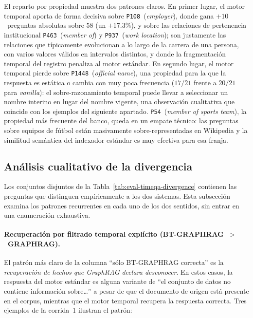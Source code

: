 El reparto por propiedad muestra dos patrones claros. En primer lugar, el motor temporal aporta de forma decisiva sobre \texttt{P108}~(\emph{employer}), donde gana $+10$~preguntas absolutas sobre $58$ (un $+17.3\%$), y sobre las relaciones de pertenencia institucional \texttt{P463}~(\emph{member of}) y \texttt{P937}~(\emph{work location}); son justamente las relaciones que típicamente evolucionan a lo largo de la carrera de una persona, con varios valores válidos en intervalos distintos, y donde la fragmentación temporal del registro penaliza al motor estándar. En segundo lugar, el motor temporal pierde sobre \texttt{P1448}~(\emph{official name}), una propiedad para la que la respuesta es estática o cambia con muy poca frecuencia ($17/21$ frente a $20/21$ para \emph{vanilla}): el sobre-razonamiento temporal puede llevar a seleccionar un nombre interino en lugar del nombre vigente, una observación cualitativa que coincide con los ejemplos del siguiente apartado. \texttt{P54}~(\emph{member of sports team}), la propiedad más frecuente del banco, queda en un empate técnico: las preguntas sobre equipos de fútbol están masivamente sobre-representadas en Wikipedia y la similitud semántica del indexador estándar es muy efectiva para esa franja.

\subsection{Análisis cualitativo de la divergencia}\label{sec:eval-timeqa-qualitative}

Los conjuntos disjuntos de la Tabla~\ref{tab:eval-timeqa-divergence} contienen las preguntas que distinguen empíricamente a los dos sistemas. Esta subsección examina los patrones recurrentes en cada uno de los dos sentidos, sin entrar en una enumeración exhaustiva.

\paragraph{Recuperación por filtrado temporal explícito (BT-GRAPHRAG~$>$~GRAPHRAG).} El patrón más claro de la columna ``sólo BT-GRAPHRAG correcta'' es la \emph{recuperación de hechos que GraphRAG declara desconocer}. En estos casos, la respuesta del motor estándar es alguna variante de ``el conjunto de datos no contiene información sobre…'' a pesar de que el documento de origen está presente en el corpus, mientras que el motor temporal recupera la respuesta correcta. Tres ejemplos de la corrida~1 ilustran el patrón:

